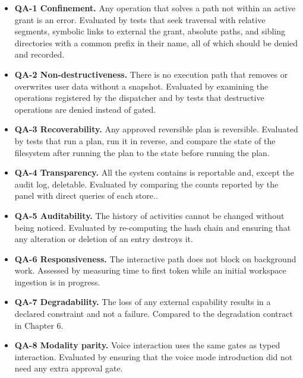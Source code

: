 \documentclass{FastFyp}
\begin{document}
\begin{itemize}
    \item \textbf{QA-1 Confinement.} Any operation that solves a path not within an active grant is an error. Evaluated by tests that seek traversal with relative segments, symbolic links to external the grant, absolute paths, and sibling directories with a common prefix in their name, all of which should be denied and recorded.
    \item \textbf{QA-2 Non-destructiveness.} There is no execution path that removes or overwrites user data without a snapshot. Evaluated by examining the operations registered by the dispatcher and by tests that destructive operations are denied instead of gated.
    \item \textbf{QA-3 Recoverability.} Any approved reversible plan is reversible. Evaluated by tests that run a plan, run it in reverse, and compare the state of the filesystem after running the plan to the state before running the plan.
    \item \textbf{QA-4 Transparency.} All the system contains is reportable and, except the audit log, deletable. Evaluated by comparing the counts reported by the panel with direct queries of each store..
    \item \textbf{QA-5 Auditability.} The history of activities cannot be changed without being noticed. Evaluated by re-computing the hash chain and ensuring that any alteration or deletion of an entry destroys it.
    \item \textbf{QA-6 Responsiveness.} The interactive path does not block on background work. Assessed by measuring time to first token while an initial workspace ingestion is in progress.
    \item \textbf{QA-7 Degradability.} The loss of any external capability results in a declared constraint and not a failure. Compared to the degradation contract in Chapter 6.
    \item \textbf{QA-8 Modality parity.} Voice interaction uses the same gates as typed interaction. Evaluated by ensuring that the voice mode introduction did not need any extra approval gate.
\end{itemize}
\end{document}
